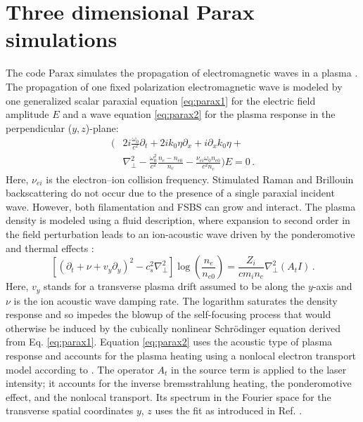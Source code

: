 \documentclass[%
 reprint,
 amsmath,amssymb,
 aps,
]{revtex4-1}
\begin{document}
\section{Three dimensional Parax simulations}
\label{sec:parax3d}
\setcounter{equation}{0} 
\renewcommand{\theequation}{B\arabic{equation}}
The code Parax   simulates the propagation of electromagnetic waves in a plasma \cite[]{POP_Michel_2003}. 
The propagation of one fixed polarization electromagnetic wave is modeled by one generalized scalar paraxial equation \eqref{eq:parax1} for the electric field amplitude $E$ and a wave equation \eqref{eq:parax2}  for the plasma response in the perpendicular ($y,z$)-plane:
\begin{align}
    \Big(&  2i\frac{\omega_0}{c^2}\partial_t  +2ik_0\eta \partial_x +i \partial_x k_0\eta+ \nonumber\\& \nabla_\perp^2-\frac{\omega_0^2}{c^2}\frac{n_e-n_{e0}}{n_c} -\frac{\nu_{ei}\omega_0n_{e0}}{c^2n_c} \Big) E = 0 \, . \label{eq:parax1}
\end{align}
Here, $\nu_{ei}$ is the electron–ion collision frequency. Stimulated Raman and Brillouin backscattering do not occur due to the presence of a single paraxial incident wave.  However, both filamentation and FSBS can grow and interact.  
The plasma density is modeled using a fluid description, where expansion to second order in the field perturbation leads to an ion-acoustic wave driven by the ponderomotive and thermal effects \cite[]{POP_Michel_2003,Walraet_2003}:
\begin{equation}\label{eq:parax2}
    \left[  (\partial_t+\nu +v_y \partial_y )^2 -c_s^2 \nabla_\perp^2 \right]\log\left(\frac{n_e}{n_{e0}}\right) = \frac{Z_i}{cm_in_c}\nabla_\perp^2( A_t I ) \, .
\end{equation}
Here, $v_y$ stands for a transverse plasma drift assumed to be along the $y$-axis and $\nu$ is the ion acoustic wave damping rate.
The logarithm saturates the density response and so impedes the blowup of the self-focusing process that would otherwise be induced by the cubically nonlinear Schr\"odinger equation derived from Eq. \eqref{eq:parax1}. 
Equation \eqref{eq:parax2}  uses the acoustic type of plasma response and accounts for the plasma heating using a nonlocal electron transport model according to \cite[]{POP_Brantov_1998}. The operator $A_t$ in the source term is applied to the laser intensity; it accounts for the inverse bremsstrahlung heating, the ponderomotive effect, and the nonlocal transport. Its spectrum in the Fourier space for the transverse spatial coordinates $y$, $z$ uses the fit as introduced in Ref.  \cite[]{POP_Brantov_1998}.
\end{document}
